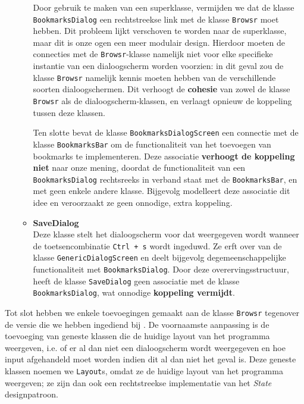 \documentclass[12pt]{article}
\begin{document}
\begin{itemize}
\begin{itemize}
		Door gebruik te maken van een superklasse, vermijden we dat de klasse \texttt{BookmarksDialog} een rechtstreekse link met de klasse \texttt{Browsr} moet hebben. Dit probleem lijkt verschoven te worden naar de superklasse, maar dit is onze ogen een meer modulair design. Hierdoor moeten de connecties met de \texttt{Browsr}-klasse namelijk niet voor elke specifieke instantie van een dialoogscherm worden voorzien: in dit geval zou de klasse \texttt{Browsr} namelijk kennis moeten hebben van de verschillende soorten dialoogschermen. Dit verhoogt de \textbf{cohesie} van zowel de klasse \texttt{Browsr} als de dialoogscherm-klassen, en verlaagt opnieuw de koppeling tussen deze klassen.
		
		Ten slotte bevat de klasse \texttt{BookmarksDialogScreen} een connectie met de klasse \texttt{BookmarksBar} om de functionaliteit van het toevoegen van bookmarks te implementeren. Deze associatie \textbf{verhoogt de koppeling niet} naar onze mening, doordat de functionaliteit van een \texttt{BookmarksDialog} rechtsreeks in verband staat met de \texttt{BookmarksBar}, en met geen enkele andere klasse. Bijgevolg modelleert deze associatie dit idee en veroorzaakt ze geen onnodige, extra koppeling.
		
		\item \textbf{SaveDialog}\\
		Deze klasse stelt het dialoogscherm voor dat weergegeven wordt wanneer de toetsencombinatie \texttt{Ctrl + s} wordt ingeduwd. Ze erft over van de klasse \texttt{GenericDialogScreen} en deelt bijgevolg degemeenschappelijke functionaliteit met \texttt{BookmarksDialog}. Door deze overervingsstructuur, heeft de klasse \texttt{SaveDialog} geen associatie met de klasse \texttt{BookmarksDialog}, wat onnodige \textbf{koppeling vermijdt}.
	\end{itemize}	
\end{itemize}

Tot slot hebben we enkele toevoegingen gemaakt aan de klasse \texttt{Browsr} tegenover de versie die we hebben ingediend bij . De voornaamste aanpassing is de toevoeging van geneste klassen die de huidige layout van het programma weergeven, i.e. of er al dan niet een dialoogscherm wordt weergegeven en hoe input afgehandeld moet worden indien dit al dan niet het geval is. Deze geneste klassen noemen we \texttt{Layout}s, omdat ze de huidige layout van het programma weergeven; ze zijn dan ook een rechtstreekse implementatie van het \textit{State} designpatroon. 
\end{document}

